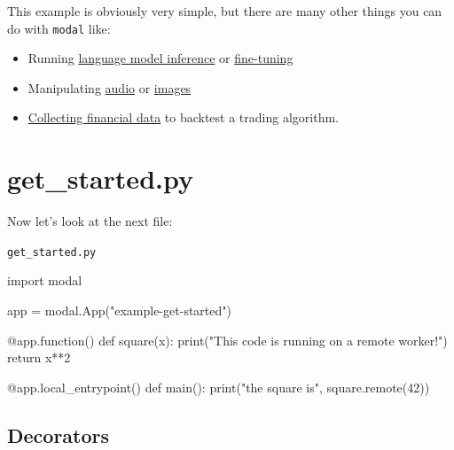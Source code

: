 \documentclass[
  letterpaper,
  DIV=11,
  numbers=noendperiod]{scrreprt}
\newenvironment{Shaded}{\begin{snugshade}}{\end{snugshade}}
\newcommand{\AttributeTok}[1]{\textcolor[rgb]{0.40,0.45,0.13}{#1}}
\newcommand{\BuiltInTok}[1]{\textcolor[rgb]{0.00,0.23,0.31}{#1}}
\newcommand{\ControlFlowTok}[1]{\textcolor[rgb]{0.00,0.23,0.31}{#1}}
\newcommand{\DecValTok}[1]{\textcolor[rgb]{0.68,0.00,0.00}{#1}}
\newcommand{\ImportTok}[1]{\textcolor[rgb]{0.00,0.46,0.62}{#1}}
\newcommand{\KeywordTok}[1]{\textcolor[rgb]{0.00,0.23,0.31}{#1}}
\newcommand{\NormalTok}[1]{\textcolor[rgb]{0.00,0.23,0.31}{#1}}
\newcommand{\OperatorTok}[1]{\textcolor[rgb]{0.37,0.37,0.37}{#1}}
\newcommand{\StringTok}[1]{\textcolor[rgb]{0.13,0.47,0.30}{#1}}
\providecommand{\tightlist}{%
  \setlength{\itemsep}{0pt}\setlength{\parskip}{0pt}}\usepackage{longtable,booktabs,array}
\begin{document}
This example is obviously very simple, but there are many other things
you can do with \texttt{modal} like:

\begin{itemize}
\tightlist
\item
  Running \href{/docs/examples/vllm_mixtral}{language model inference}
  or \href{/docs/examples/slack-finetune}{fine-tuning}
\item
  Manipulating \href{/docs/examples/discord-musicgen}{audio} or
  \href{stable_diffusion_xl_turbo}{images}
\item
  \href{/docs/examples/fetch_stock_prices}{Collecting financial data} to
  backtest a trading algorithm.
\end{itemize}


\hypertarget{get_started.py}{%
\chapter{get\_started.py}\label{get_started.py}}

Now let's look at the next file:

\begin{codelisting}

\caption{\texttt{get_started.py}}

\begin{Shaded}
\begin{Highlighting}[]
\ImportTok{import}\NormalTok{ modal}

\NormalTok{app }\OperatorTok{=}\NormalTok{ modal.App(}\StringTok{"example{-}get{-}started"}\NormalTok{)}

\AttributeTok{@app.function}\NormalTok{()}
\KeywordTok{def}\NormalTok{ square(x):}
    \BuiltInTok{print}\NormalTok{(}\StringTok{"This code is running on a remote worker!"}\NormalTok{)}
    \ControlFlowTok{return}\NormalTok{ x}\OperatorTok{**}\DecValTok{2}


\AttributeTok{@app.local\_entrypoint}\NormalTok{()}
\KeywordTok{def}\NormalTok{ main():}
    \BuiltInTok{print}\NormalTok{(}\StringTok{"the square is"}\NormalTok{, square.remote(}\DecValTok{42}\NormalTok{))}
\end{Highlighting}
\end{Shaded}

\end{codelisting}

\hypertarget{decorators}{%
\section{Decorators}\label{decorators}}
\end{document}
